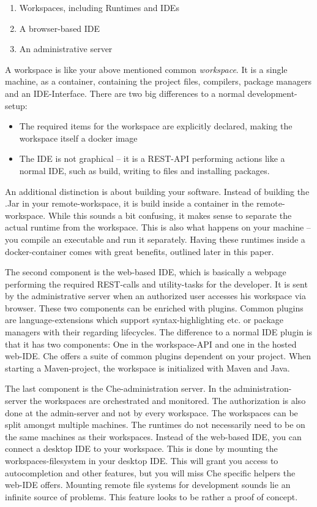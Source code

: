 \documentclass[utf8]{lni}
\begin{document}
\begin{enumerate}
	\item Workspaces, including Runtimes and IDEs
	\item A browser-based IDE
	\item An administrative server
\end{enumerate}
A workspace is like your above mentioned common \textit{workspace}. 
It is a single machine, as a container, containing the project files, compilers, package managers and an IDE-Interface. 
There are two big differences to a normal development-setup:
\begin{itemize}
	\item The required items for the workspace are explicitly  declared, making  the  workspace itself a docker image
	\item The IDE is not graphical – it is a REST-API performing actions like a normal IDE, such as build, writing to files and installing packages.  
\end{itemize}
An additional distinction is about building your software.
Instead of building the .Jar in your remote-workspace, it is build inside a container in the remote-workspace.
While this sounds a bit confusing, it makes sense to separate the actual runtime from the workspace. 
This is also what happens on your machine – you compile an executable and run it separately. 
Having these runtimes inside a docker-container comes with great benefits, outlined later in this paper.

The second component is the web-based IDE, which is basically a webpage performing the required REST-calls and utility-tasks for the developer. 
It is sent by the administrative server when an authorized user accesses his workspace via browser. 
These two components can be enriched with plugins.  
Common plugins are language-extensions which support syntax-highlighting etc. or package managers with their regarding lifecycles.
The difference to a normal IDE plugin is that it has two components: 
One in the workspace-API and one in the hosted web-IDE.  
Che offers a suite of common plugins dependent on your project. 
When starting a Maven-project, the workspace is initialized with Maven and Java.

The last component is the Che-administration server. 
In the administration-server the workspaces are orchestrated and monitored. 
The authorization is also done at the admin-server and not by every workspace.
The workspaces can be split amongst multiple machines.
The runtimes do not necessarily need to be on the same machines as their workspaces. 
Instead of the web-based IDE, you can connect a desktop IDE to your workspace. 
This is done by mounting the workspaces-filesystem  in  your  desktop  IDE. 
This  will grant you access to autocompletion and other features, but you will miss Che specific helpers the web-IDE offers. 
Mounting remote file systems for development sounds lie an infinite source of problems.
This feature looks to be rather a proof of concept.
\end{document}
